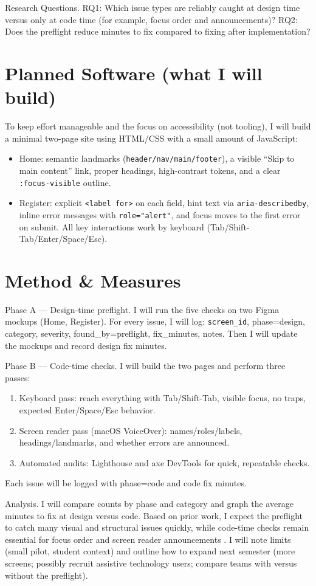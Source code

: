\documentclass[12pt]{article}
\begin{document}
Research Questions. RQ1: Which issue types are reliably caught at design time versus only at code time (for example, focus order and announcements)? RQ2: Does the preflight reduce minutes to fix compared to fixing after implementation?

\section*{Planned Software (what I will build)}
To keep effort manageable and the focus on accessibility (not tooling), I will build a minimal two-page site using HTML/CSS with a small amount of JavaScript:
\begin{itemize}
  \item Home: semantic landmarks (\texttt{header/nav/main/footer}), a visible “Skip to main content” link, proper headings, high-contrast tokens, and a clear \texttt{:focus-visible} outline.
  \item Register: explicit \texttt{<label for>} on each field, hint text via \texttt{aria-describedby}, inline error messages with \texttt{role="alert"}, and focus moves to the first error on submit. All key interactions work by keyboard (Tab/Shift-Tab/Enter/Space/Esc).
\end{itemize}

\section*{Method \& Measures}
Phase A — Design-time preflight. I will run the five checks on two Figma mockups (Home, Register). For every issue, I will log: \texttt{screen\_id}, phase=design, category, severity, found\_by=preflight, fix\_minutes, notes. Then I will update the mockups and record design fix minutes.

Phase B — Code-time checks. I will build the two pages and perform three passes:
\begin{enumerate}
  \item Keyboard pass: reach everything with Tab/Shift-Tab, visible focus, no traps, expected Enter/Space/Esc behavior.
  \item Screen reader pass (macOS VoiceOver): names/roles/labels, headings/landmarks, and whether errors are announced.
  \item Automated audits: Lighthouse and axe DevTools for quick, repeatable checks.
\end{enumerate}
Each issue will be logged with phase=code and code fix minutes.

Analysis. I will compare counts by phase and category and graph the average minutes to fix at design versus code. Based on prior work, I expect the preflight to catch many visual and structural issues quickly, while code-time checks remain essential for focus order and screen reader announcements \cite{huang2024a11yfigma, chen2024figmaapps, shi2023uxaccesspractice}. I will note limits (small pilot, student context) and outline how to expand next semester (more screens; possibly recruit assistive technology users; compare teams with versus without the preflight).
\end{document}
